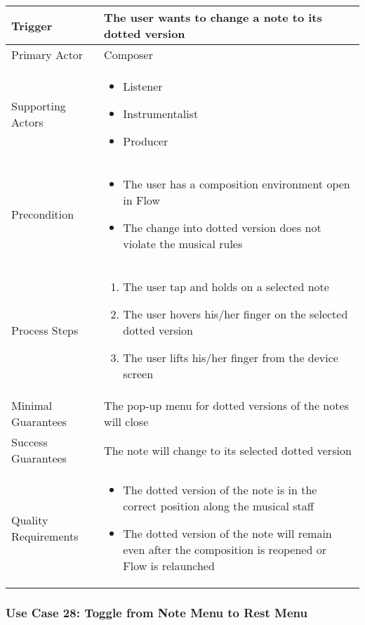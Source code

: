 \begin{tabularx}{\textwidth}{|X|X|}
\hline
Trigger & 
The user wants to change a note to its dotted version \\
\hline
Primary Actor & 
Composer \\
\hline
Supporting Actors & 
\begin{itemize}
\item Listener
\item Instrumentalist
\item Producer
\end{itemize} \\
\hline
Precondition & 
\begin{itemize}
\item The user has a composition environment open in Flow
\item The change into dotted version does not violate the musical rules
\end{itemize} \\
\hline
Process Steps & 
\begin{enumerate}
\item The user tap and holds on a selected note
\item The user hovers his/her finger on the selected dotted version
\item The user lifts his/her finger from the device screen
\end{enumerate} \\
\hline
Minimal Guarantees & 
The pop-up menu for dotted versions of the notes will close\\
\hline
Success Guarantees & 
The note will change to its selected dotted version \\
\hline
Quality Requirements & 
\begin{itemize}
\item The dotted version of the note is in the correct position along the musical staff
\item The dotted version of the note will remain even after the composition is reopened or Flow is relaunched
\end{itemize} \\ 
\hline
\end{tabularx}

\subsubsection{Use Case 28: Toggle from Note Menu to Rest Menu}

